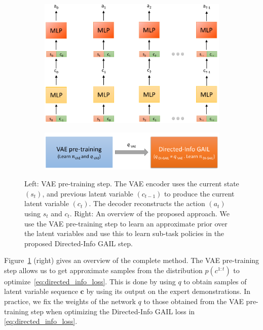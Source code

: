 \documentclass{article} %
\begin{document}
\begin{figure}
    \centering
    \begin{subfigure}{0.56\columnwidth}
    \includegraphics[scale=0.4]{figures/VAE_step2.pdf}
    \end{subfigure}
    \centering
    \begin{subfigure}{0.4\columnwidth}
    \includegraphics[scale=0.26]{figures/pipeline.pdf}
    \end{subfigure}
    \caption{Left: VAE pre-training step. The VAE encoder uses the current state $(s_t)$, and previous latent variable $(c_{t-1})$ to produce the current latent variable $(c_{t})$. The decoder reconstructs the action $(a_t)$ using $s_t$ and $c_t$. Right: An overview of the proposed approach. We use the VAE pre-training step to learn an approximate prior over the latent variables and use this to learn sub-task policies in the proposed Directed-Info GAIL step.}
    \label{fig:vae_pretraining_step}

\end{figure}


Figure~\ref{fig:vae_pretraining_step} (right) gives an overview of the complete method. The VAE pre-training step allows us to get approximate samples from the distribution $p(c^{1:t})$ to optimize~\eqref{eq:directed_info_loss}. This is done by using $q$ to obtain samples of latent variable sequence $\boldsymbol{c}$ by using its output on the expert demonstrations. In practice, we fix the weights of the network $q$ to those obtained from the VAE pre-training step when optimizing the Directed-Info GAIL loss in \eqref{eq:directed_info_loss}.
\end{document}
